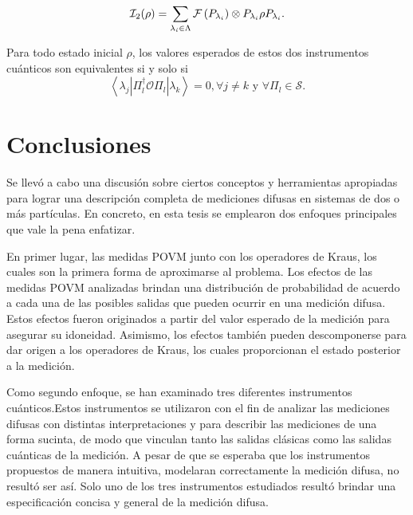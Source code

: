 \documentclass[12pt,letterpaper]{book}\raggedbottom{}
\begin{document}
\begin{equation*}
    \mathcal{I}_2(\rho)= \sum_{\lambda_i \in \Lambda } \mathcal{F}\left(P_{\lambda_i}\right)\otimes P_{\lambda_i}\rho P_{\lambda_i}.
\end{equation*} 


\begin{proposition}
    Para todo estado inicial $\rho$, los valores esperados de estos dos instrumentos
cuánticos son equivalentes si y solo si \[\left \langle \lambda_j \left|\Pi_l^\dagger
\mathcal{O} \Pi_l\right|\lambda_k\right\rangle=0,\forall j\ne k \text{ y }
\forall \Pi_l \in \mathcal{S}.\]
\end{proposition} 



\section{Conclusiones}

Se llevó a cabo una discusión sobre ciertos conceptos y herramientas apropiadas para lograr una descripción completa de mediciones difusas en sistemas
de dos o más partículas. En concreto, en esta tesis se emplearon dos enfoques
principales que vale la pena enfatizar.


En primer lugar, las medidas POVM junto con los operadores de Kraus, los cuales
son la primera forma de aproximarse al problema. Los efectos de las medidas
POVM  analizadas brindan una distribución de probabilidad de acuerdo a cada una
de las posibles salidas que pueden ocurrir en una medición difusa. Estos
efectos fueron originados a partir del valor esperado de la medición para
asegurar su idoneidad.  Asimismo, los efectos también pueden descomponerse
para dar origen a los operadores de Kraus, los cuales proporcionan el estado
posterior a la medición.

Como segundo enfoque, se han examinado tres diferentes instrumentos cuánticos.Estos instrumentos se utilizaron con el fin de analizar las mediciones difusas con distintas interpretaciones y para describir las mediciones de una forma sucinta, de modo que vinculan tanto las salidas clásicas como las salidas cuánticas de la medición. A pesar de que se esperaba que los instrumentos propuestos de manera intuitiva, modelaran correctamente la medición difusa, no resultó ser así. Solo uno de los tres instrumentos estudiados resultó brindar una especificación concisa y general de la medición difusa.
\end{document}
